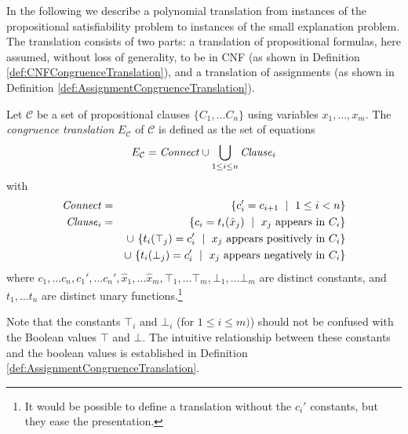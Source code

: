 \documentclass[smallextended]{svjour3}
\newcommand{\Clause}{{\it Clause}}
\newcommand{\Connect}{{\it Connect}}
\begin{document}
In the following we describe a polynomial translation from instances of the propositional satisfiability problem to instances of the small explanation problem.
The translation consists of two
parts: a translation of propositional formulas, here assumed, without loss
of generality, to be in CNF (as shown in Definition \ref{def:CNFCongruenceTranslation}), and a translation of assignments (as shown in Definition \ref{def:AssignmentCongruenceTranslation}).


\begin{definition}
\label{def:CNFCongruenceTranslation}
Let $\mathcal{C}$ be a set of propositional clauses $\{C_1,\ldots C_n\}$ using variables $x_1,\ldots,x_m$.
The \emph{congruence translation} $E_{\mathcal{C}}$ of\/ $\mathcal{C}$ is defined as the set of equations
\begin{equation*}
E_{\mathcal{C}} = \Connect \cup \bigcup_{1 \leq i \leq n}\Clause_i 
\end{equation*}
with
\begin{eqnarray*}
        \Connect &=& \{ c_{i}' = c_{i+1} \ \mid\ 1 \leq i < n\}\\
        \Clause_i &=& \{ c_i = t_i(\hat{x}_j) \ \mid\ x_j \text{ appears in } C_i \}\\
           & & \cup\ \{ t_i(\top_j) = c_i' \ \mid\ x_j \text{ appears positively in } C_i \}\\
           & & \cup\ \{ t_i(\bot_j) = c_i' \ \mid\ x_j \text{ appears negatively in } C_i \}
\end{eqnarray*}
where $c_{1},\dots c_{n},c_{1}', \dots c_{n}',
\hat{x}_1, \dots \hat{x}_m, \top_1, \dots \top_m, \bot_1, \dots \bot_m$ are distinct constants, and $t_1, \dots t_n$ are
distinct unary functions.\footnote{It would be possible to define a translation without the $c_i'$ constants, but they ease the presentation.}
\end{definition}

\begin{remark}
Note that the constants $\top_i$ and $\bot_i$ (for $1 \leq i \leq m)$) should not be confused with the Boolean values $\top$ and $\bot$. The intuitive relationship between these constants and the boolean values is established in Definition \ref{def:AssignmentCongruenceTranslation}.
\end{remark}
\end{document}
